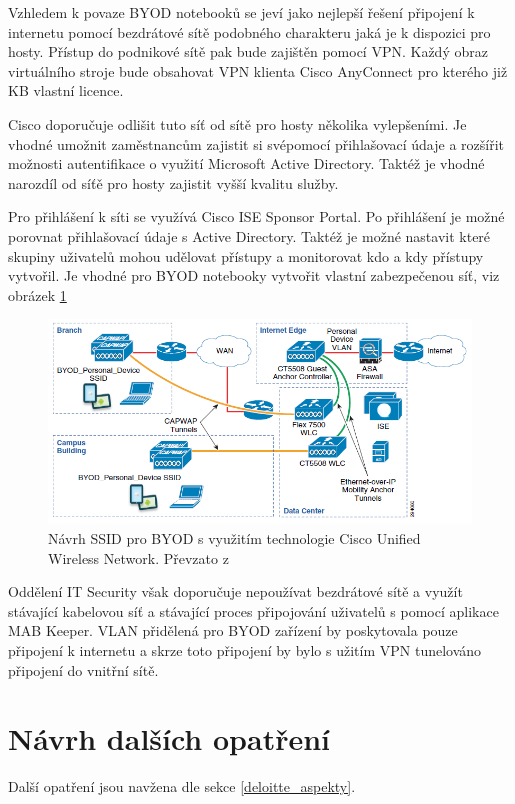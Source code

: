 Vzhledem k povaze BYOD notebooků se jeví jako nejlepší řešení připojení k internetu pomocí bezdrátové sítě podobného charakteru jaká je k dispozici pro hosty. Přístup do podnikové sítě pak bude zajištěn pomocí VPN. Každý obraz virtuálního stroje bude obsahovat VPN klienta Cisco AnyConnect pro kterého již KB vlastní licence.

Cisco doporučuje \cite{CiscoDesign} odlišit tuto síť od sítě pro hosty několika vylepšeními. Je vhodné umožnit zaměstnancům zajistit si svépomocí přihlašovací údaje a rozšířit možnosti autentifikace o využití Microsoft Active Directory. Taktéž je vhodné narozdíl od síťě pro hosty zajistit vyšší kvalitu služby.

Pro přihlášení k síti se využívá Cisco ISE Sponsor Portal. Po přihlášení je možné porovnat přihlašovací údaje s Active Directory. Taktéž je možné nastavit které skupiny uživatelů mohou udělovat přístupy a monitorovat kdo a kdy přístupy vytvořil. Je vhodné pro BYOD notebooky vytvořit vlastní zabezpečenou síť, viz obrázek \ref{CiscoCUWN}

\begin{figure}[h!]
\centering
\includegraphics[width=13cm]{img/CiscoCUWN}
\caption{Návrh SSID pro BYOD s využitím technologie Cisco Unified Wireless Network. Převzato z \cite{CiscoDesign}}\label{CiscoCUWN}
\end{figure}%

Oddělení IT Security však doporučuje nepoužívat bezdrátové sítě a využít stávající kabelovou síť a stávající proces připojování uživatelů s pomocí aplikace MAB Keeper. VLAN přidělená pro BYOD zařízení by poskytovala pouze připojení k internetu a skrze toto připojení by bylo s užitím VPN tunelováno připojení do vnitřní sítě. 



\section{Návrh dalších opatření}\label{dalsi_opatreni}
Další opatření jsou navžena dle sekce \ref{deloitte_aspekty}.


